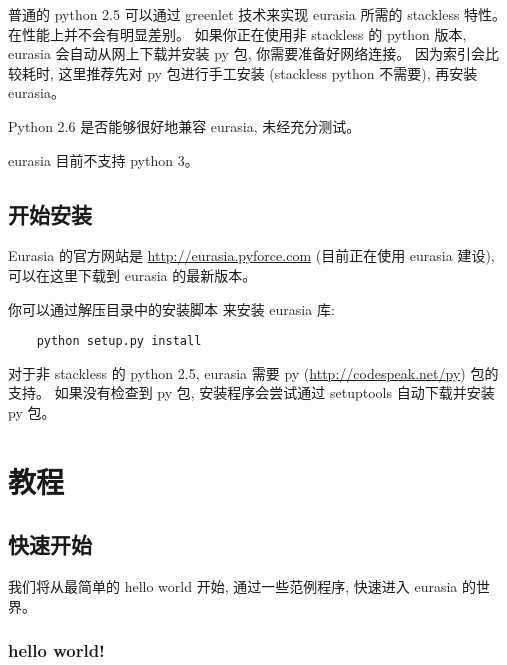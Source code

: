 \documentclass{manual}
\begin{document}

普通的 python 2.5 可以通过 greenlet 技术来实现 eurasia 所需的 stackless 特性。在性能上并不会有明显差别。
如果你正在使用非 stackless 的 python 版本, eurasia 会自动从网上下载并安装 py 包, 你需要准备好网络连接。
因为索引会比较耗时, 这里推荐先对 py 包进行手工安装 (stackless python 不需要), 再安装 eurasia。


Python 2.6 是否能够很好地兼容 eurasia, 未经充分测试。


eurasia 目前不支持 python 3。

\section{开始安装}

Eurasia 的官方网站是 \url{http://eurasia.pyforce.com} (目前正在使用 eurasia 建设),
可以在这里下载到 eurasia 的最新版本。

你可以通过解压目录中的安装脚本  来安装 eurasia 库:

\begin{verbatim}
    python setup.py install
\end{verbatim}

对于非 stackless 的 python 2.5, eurasia 需要 py (\url{http://codespeak.net/py}) 包的支持。
如果没有检查到 py 包, 安装程序会尝试通过 setuptools 自动下载并安装 py 包。



\chapter{教程}

\section{快速开始}

我们将从最简单的 hello world 开始, 通过一些范例程序, 快速进入 eurasia 的世界。

\subsection{hello world!}
\end{document}
